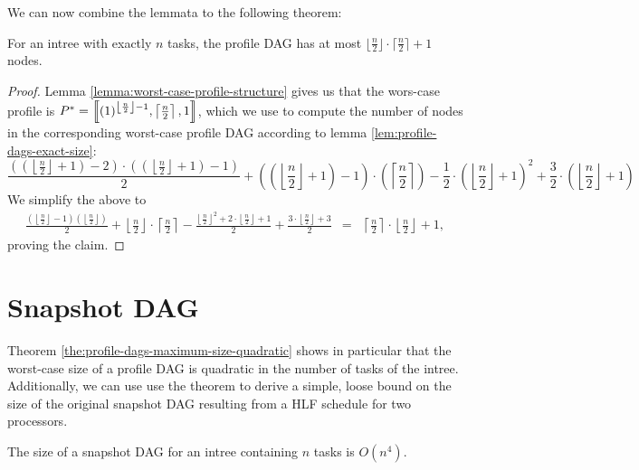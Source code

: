 We can now combine the lemmata to the following theorem:

\begin{theorem}
  \label{the:profile-dags-maximum-size-quadratic}
  For an intree with exactly $n$ tasks, the profile DAG has at most $\lfloor \frac{n}{2} \rfloor \cdot \lceil \frac{n}{2} \rceil +1$ nodes.
\end{theorem}

\begin{proof}
  Lemma \ref{lemma:worst-case-profile-structure} gives us that the wors-case profile is $P^*=\left\llbracket  (1)^{ \left\lfloor\frac{n}{2} \right\rfloor - 1}, \left\lceil \frac{n}{2} \right\rceil, 1  \right\rrbracket$, which we use to compute the number of nodes in the corresponding worst-case profile DAG according to lemma \ref{lem:profile-dags-exact-size}:
  \renewcommand{\r}{\left(\left\lfloor\frac{n}{2}\right\rfloor + 1\right)}
  \begin{equation*}
    \frac{(\r-2)\cdot(\r-1)}{2} + 
    \left(\r-1\right)\cdot\left( \left\lceil \frac{n}{2} \right\rceil \right)
    - \frac{1}{2} \cdot \r^2 + \frac{3}{2} \cdot \r     
  \end{equation*}
  We simplify the above to
  \newcommand{\ceiln}{\left\lceil \frac{n}{2} \right\rceil}
  \newcommand{\floorn}{\left\lfloor \frac{n}{2} \right\rfloor}
  \begin{eqnarray*}
    \frac{\left( \floorn -1 \right)\left( \floorn \right)}{2}
    + \floorn \cdot \ceiln
    - \frac{\floorn^2 + 2\cdot \floorn + 1}{2}
    + \frac{3\cdot \floorn + 3}{2}
    & = &
    \ceiln \cdot \floorn + 1,
  \end{eqnarray*}
  proving the claim.
\end{proof}

\section{Snapshot DAG}
\label{sec:p2-snapshot-dag}

Theorem \ref{the:profile-dags-maximum-size-quadratic} shows in particular that the worst-case size of a profile DAG is quadratic in the number of tasks of the intree. Additionally, we can use use the theorem to derive a simple, loose bound on the size of the original snapshot DAG resulting from a HLF schedule for two processors.

\begin{corollary}
  The size of a snapshot DAG for an intree containing $n$ tasks is $O(n^4)$.
\end{corollary}

